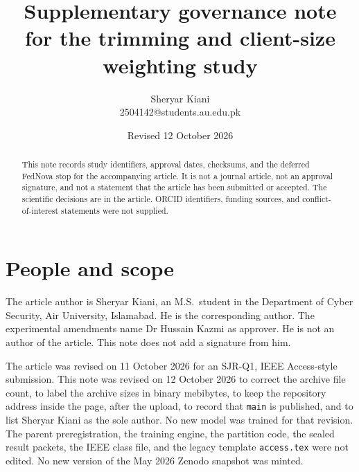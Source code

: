 \documentclass[11pt]{article}
\title{Supplementary governance note\\for the trimming and client-size weighting study}
\author{Sheryar Kiani\\2504142@students.au.edu.pk}
\date{Revised 12 October 2026}
\begin{document}
\maketitle
\begin{abstract}
\noindent This note records study identifiers, approval dates, checksums, and the deferred FedNova stop for the accompanying article. It is not a journal article, not an approval signature, and not a statement that the article has been submitted or accepted. The scientific decisions are in the article. ORCID identifiers, funding sources, and conflict-of-interest statements were not supplied.
\end{abstract}

\section{People and scope}
The article author is Sheryar Kiani, an M.S.\ student in the Department of Cyber Security, Air University, Islamabad. He is the corresponding author. The experimental amendments name Dr Hussain Kazmi as approver. He is not an author of the article. This note does not add a signature from him.

The article was revised on 11 October 2026 for an SJR-Q1, IEEE Access-style submission. This note was revised on 12 October 2026 to correct the archive file count, to label the archive sizes in binary mebibytes, to keep the repository address inside the page, after the upload, to record that \texttt{main} is published, and to list Sheryar Kiani as the sole author. No new model was trained for that revision. The parent preregistration, the training engine, the partition code, the sealed result packets, the IEEE class file, and the legacy template \texttt{access.tex} were not edited. No new version of the May 2026 Zenodo snapshot was minted.
\end{document}
